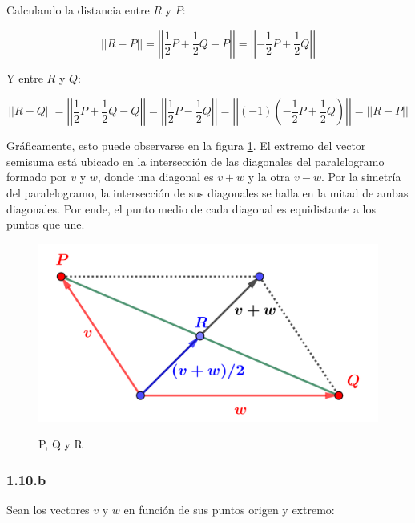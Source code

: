 \documentclass{article}
\begin{document}
Calculando la distancia entre $R$ y $P$:

\begin{equation}
||R-P|| = \left|\left| \frac{1}{2} P + \frac{1}{2} Q - P \right|\right| = \left|\left| -\frac{1}{2} P + \frac{1}{2} Q \right|\right|
\end{equation}

Y entre $R$ y $Q$:

\begin{equation}
||R-Q|| = \left|\left| \frac{1}{2} P + \frac{1}{2} Q - Q \right|\right| = \left|\left| \frac{1}{2} P - \frac{1}{2} Q \right|\right| = \left|\left| (-1) \left(- \frac{1}{2} P + \frac{1}{2} Q \right) \right|\right| = ||R-P||
\end{equation}

Gráficamente, esto puede observarse en la figura \ref{fig:1-10-a}. El extremo del vector semisuma está ubicado en la intersección de las diagonales del paralelogramo formado por $v$ y $w$, donde una diagonal es $v+w$ y la otra $v-w$. Por la simetría del paralelogramo, la intersección de sus diagonales se halla en la mitad de ambas diagonales. Por ende, el punto medio de cada diagonal es equidistante a los puntos que une.

\begin{figure}[ht]
\caption{P, Q y R}
\includegraphics[scale=1]{img/ejercicios/1/10-a.png} 
\centering
\label{fig:1-10-a}
\end{figure}

\subsubsection*{1.10.b}
\label{subsubsec:1.10.b}

Sean los vectores $v$ y $w$ en función de sus puntos origen y extremo:
\end{document}
